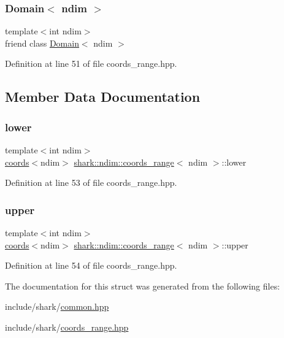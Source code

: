 \subsubsection{\texorpdfstring{Domain$<$ ndim $>$}{Domain< ndim >}}
{\footnotesize\ttfamily template$<$int ndim$>$ \\
friend class \hyperlink{classshark_1_1ndim_1_1_domain}{Domain}$<$ ndim $>$\hspace{0.3cm}{\ttfamily [friend]}}



Definition at line 51 of file coords\+\_\+range.\+hpp.



\subsection{Member Data Documentation}
\hypertarget{structshark_1_1ndim_1_1coords__range_a46cae2c424d7b20f911a970c92581b19}{}\label{structshark_1_1ndim_1_1coords__range_a46cae2c424d7b20f911a970c92581b19} 
\subsubsection{\texorpdfstring{lower}{lower}}
{\footnotesize\ttfamily template$<$int ndim$>$ \\
\hyperlink{structshark_1_1ndim_1_1coords}{coords}$<$ndim$>$ \hyperlink{structshark_1_1ndim_1_1coords__range}{shark\+::ndim\+::coords\+\_\+range}$<$ ndim $>$\+::lower}



Definition at line 53 of file coords\+\_\+range.\+hpp.

\hypertarget{structshark_1_1ndim_1_1coords__range_ae0101e4bb3ecadf1faa0fc786dfb05db}{}\label{structshark_1_1ndim_1_1coords__range_ae0101e4bb3ecadf1faa0fc786dfb05db} 
\subsubsection{\texorpdfstring{upper}{upper}}
{\footnotesize\ttfamily template$<$int ndim$>$ \\
\hyperlink{structshark_1_1ndim_1_1coords}{coords}$<$ndim$>$ \hyperlink{structshark_1_1ndim_1_1coords__range}{shark\+::ndim\+::coords\+\_\+range}$<$ ndim $>$\+::upper}



Definition at line 54 of file coords\+\_\+range.\+hpp.



The documentation for this struct was generated from the following files\+:\begin{DoxyCompactItemize}
\item 
include/shark/\hyperlink{common_8hpp}{common.\+hpp}\item 
include/shark/\hyperlink{coords__range_8hpp}{coords\+\_\+range.\+hpp}\end{DoxyCompactItemize}
